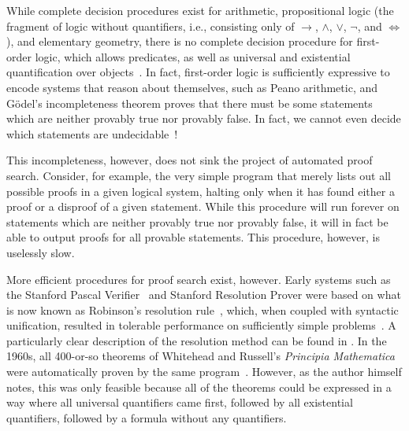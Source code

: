 While complete decision procedures exist for arithmetic, propositional logic (the fragment of logic without quantifiers, i.e., consisting only of $\to$, $\wedge$, $\vee$, $\neg$, and $\iff$), and elementary geometry, there is no complete decision procedure for first-order logic, which allows predicates, as well as universal and existential quantification over objects~\cite{davis2001early}.
In fact, first-order logic is sufficiently expressive to encode systems that reason about themselves, such as Peano arithmetic, and Gödel's incompleteness theorem proves that there must be some statements which are neither provably true nor provably false.
In fact, we cannot even decide which statements are undecidable~\cite{Are2011Makholm}!

This incompleteness, however, does not sink the project of automated proof search.
Consider, for example, the very simple program that merely lists out all possible proofs in a given logical system, halting only when it has found either a proof or a disproof of a given statement.
While this procedure will run forever on statements which are neither provably true nor provably false, it will in fact be able to output proofs for all provable statements.
This procedure, however, is uselessly slow.

More efficient procedures for proof search exist, however.
Early systems such as the Stanford Pascal Verifier~\cite{luckham1979stanford} and Stanford Resolution Prover were based on what is now known as Robinson's resolution rule~\cite{Machine1965Robinson}, which, when coupled with syntactic unification, resulted in tolerable performance on sufficiently simple problems~\cite{davis2001early,Brief2019Darbari}.
A particularly clear description of the resolution method can be found in \textcite[pp.~17--18]{Metamathematics1994Shankar}.
In the 1960s, all 400-or-so theorems of Whitehead and Russell's \emph{Principia Mathematica} were automatically proven by the same program~\cite[p.~9]{davis2001early}.
However, as the author himself notes, this was only feasible because all of the theorems could be expressed in a way where all universal quantifiers came first, followed by all existential quantifiers, followed by a formula without any quantifiers.

